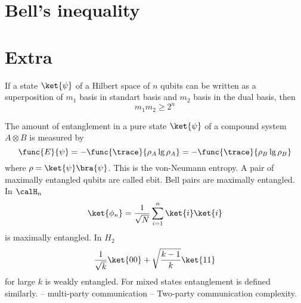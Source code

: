  \section{Bell's inequality}

 \section{Extra}
 \begin{theorem}
    If a state \(\ket{\psi}\) of a Hilbert space of \(n\) qubits can be written as a superposition of \(m_1\) basis in standart basis and \(m_2\) basis in the dual basis, then 
    \begin{equation*}
        m_1 m_2 \geq 2^n
    \end{equation*}
 \end{theorem}
 The amount of entanglement in a pure state \(\ket{\psi}\) of a compound system \(A \otimes B\) is measured by
 \begin{equation*}
    \func{E}{\psi} = - \func{\trace}{\rho_A \lg \rho_A} = - \func{\trace}{\rho_B \lg \rho_B}
 \end{equation*}
 where \(\rho = \ket{\psi} \bra{\psi}\). This is the von-Neumann entropy. A pair of maximally entangled qubits are called ebit. Bell pairs are maximally entangled.
 In \(\calH_n\)
 \begin{equation*}
    \ket{\phi_n} = \dfrac{1}{\sqrt{N}} \sum_{i = 1}^n \ket{i}\ket{i}
 \end{equation*}
is maximally entangled. In \(H_2\) 
\begin{equation*}
    \frac{1}{\sqrt{k}} \ket{00} + \sqrt{\dfrac{k-1}{k}} \ket{11}
\end{equation*}
for large \(k\) is weakly entangled. For mixed states entanglement is defined similarly.
-- multi-party communication
-- Two-party communication complexity.